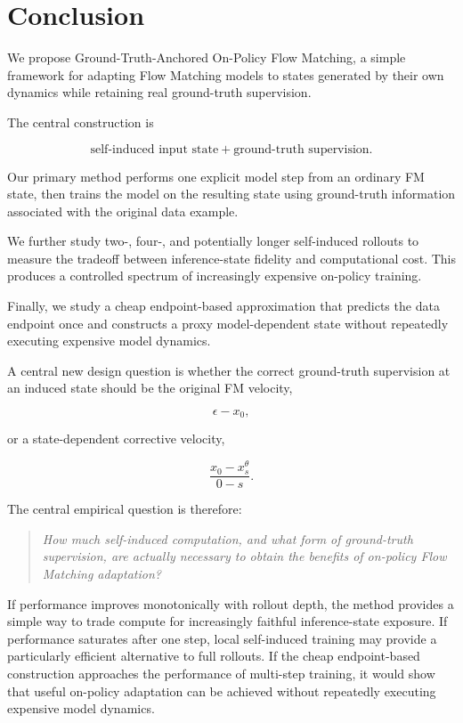 \documentclass[11pt]{article}
\begin{document}
\section{Conclusion}

We propose Ground-Truth-Anchored On-Policy Flow Matching, a simple framework
for adapting Flow Matching models to states generated by their own dynamics
while retaining real ground-truth supervision.

The central construction is

\begin{equation}
\boxed{
\text{self-induced input state}
+
\text{ground-truth supervision}.
}
\end{equation}

Our primary method performs one explicit model step from an ordinary FM state,
then trains the model on the resulting state using ground-truth information
associated with the original data example.

We further study two-, four-, and potentially longer self-induced rollouts to
measure the tradeoff between inference-state fidelity and computational cost.
This produces a controlled spectrum of increasingly expensive on-policy
training.

Finally, we study a cheap endpoint-based approximation that predicts the data
endpoint once and constructs a proxy model-dependent state without repeatedly
executing expensive model dynamics.

A central new design question is whether the correct ground-truth supervision
at an induced state should be the original FM velocity,

\begin{equation}
\epsilon-x_0,
\end{equation}

or a state-dependent corrective velocity,

\begin{equation}
\frac{x_0-x_s^\theta}{0-s}.
\end{equation}

The central empirical question is therefore:

\begin{quote}
\emph{How much self-induced computation, and what form of ground-truth
supervision, are actually necessary to obtain the benefits of on-policy
Flow Matching adaptation?}
\end{quote}

If performance improves monotonically with rollout depth, the method provides a
simple way to trade compute for increasingly faithful inference-state
exposure. If performance saturates after one step, local self-induced training
may provide a particularly efficient alternative to full rollouts. If the
cheap endpoint-based construction approaches the performance of multi-step
training, it would show that useful on-policy adaptation can be achieved
without repeatedly executing expensive model dynamics.
\end{document}
